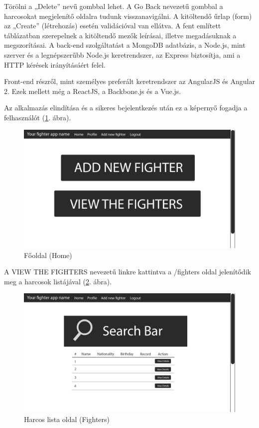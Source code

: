 Törölni a „Delete” nevű gombbal lehet. A Go Back nevezetű gombbal a harcosokat megjelenítő oldalra tudunk visszanavigálni. A kitöltendő űrlap (form) az „Create” (létrehozás) esetén validációval van ellátva. A fent említett táblázatban szerepelnek a kitöltendő mezők leírásai, illetve megadásuknak a megszorításai. A back-end szolgáltatást a MongoDB adatbázis, a Node.js, mint szerver és a legnépszerűbb Node.js keretrendszer, az Express biztosítja, ami a HTTP kérések irányításáért felel.

Front-end részről, mint személyes preferált keretrendszer az AngularJS és Angular 2. Ezek mellett még a ReactJS, a Backbone.js és a Vue.js.

Az alkalmazás elindítása és a sikeres bejelentkezés után ez a képernyő fogadja a felhasználót (\ref{fig:new_fighter}. ábra).

\begin{figure}[htb]
\centering
\includegraphics[scale=0.2]{kepek/new_fighter.jpeg}
\caption{Főoldal (Home)}
\label{fig:new_fighter}
\end{figure}

A VIEW THE FIGHTERS nevezetű linkre kattintva a /fighters oldal jelenítődik meg a harcosok listájával (\ref{fig:search_bar}. ábra).

\begin{figure}[htb]
\centering
\includegraphics[scale=0.2]{kepek/search_bar.jpeg}
\caption{Harcos lista oldal (Fighters)}
\label{fig:search_bar}
\end{figure}

